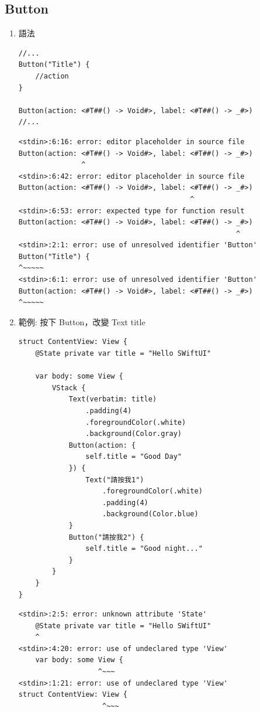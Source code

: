 \documentclass[a4paper,12pt]{article}
\begin{document}
\subsection{Button}
\label{sec:org1a4f104}
\begin{enumerate}
\item 語法
\label{sec:org412ab74}
\lstset{breaklines=true,language=swift,label= ,caption= ,captionpos=b,firstnumber=1,numbers=left}
\begin{lstlisting}
//...
Button("Title") {
    //action
}

Button(action: <#T##() -> Void#>, label: <#T##() -> _#>)
//...
\end{lstlisting}

\begin{verbatim}
<stdin>:6:16: error: editor placeholder in source file
Button(action: <#T##() -> Void#>, label: <#T##() -> _#>)
               ^
<stdin>:6:42: error: editor placeholder in source file
Button(action: <#T##() -> Void#>, label: <#T##() -> _#>)
                                         ^
<stdin>:6:53: error: expected type for function result
Button(action: <#T##() -> Void#>, label: <#T##() -> _#>)
                                                    ^
<stdin>:2:1: error: use of unresolved identifier 'Button'
Button("Title") {
^~~~~~
<stdin>:6:1: error: use of unresolved identifier 'Button'
Button(action: <#T##() -> Void#>, label: <#T##() -> _#>)
^~~~~~
\end{verbatim}

\item 範例: 按下 Button，改變 Text title
\label{sec:orgaca7569}
\lstset{breaklines=true,language=swift,label= ,caption= ,captionpos=b,firstnumber=1,numbers=left}
\begin{lstlisting}
struct ContentView: View {
    @State private var title = "Hello SWiftUI"

    var body: some View {
        VStack {
            Text(verbatim: title)
                .padding(4)
                .foregroundColor(.white)
                .background(Color.gray)
            Button(action: {
                self.title = "Good Day"
            }) {
                Text("請按我1")
                    .foregroundColor(.white)
                    .padding(4)
                    .background(Color.blue)
            }
            Button("請按我2") {
                self.title = "Good night..."
            }
        }
    }
}
\end{lstlisting}

\begin{verbatim}
<stdin>:2:5: error: unknown attribute 'State'
    @State private var title = "Hello SWiftUI"
    ^
<stdin>:4:20: error: use of undeclared type 'View'
    var body: some View {
                   ^~~~
<stdin>:1:21: error: use of undeclared type 'View'
struct ContentView: View {
                    ^~~~
\end{verbatim}


\end{enumerate}
\end{document}
